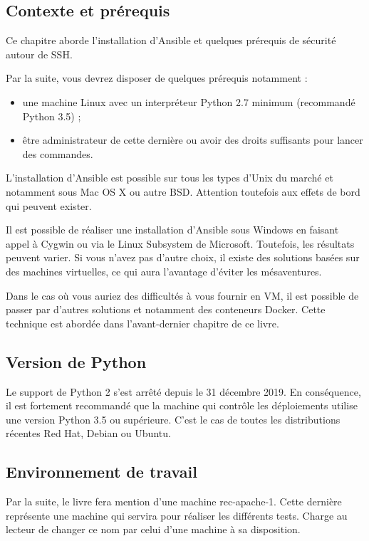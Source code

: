 \documentclass[hidelinks]{article}
\begin{document}
\subsection{Contexte et prérequis}
Ce chapitre aborde l'installation d'Ansible et quelques prérequis de sécurité autour de SSH.

Par la suite, vous devrez disposer de quelques prérequis notamment  :
\begin{itemize}
    \item une machine Linux avec un interpréteur Python 2.7 minimum (recommandé Python 3.5) ;
    \item être administrateur de cette dernière ou avoir des droits suffisants pour lancer des commandes.
\end{itemize}

L'installation d'Ansible est possible sur tous les types d'Unix du marché et notamment sous Mac OS X ou autre BSD. Attention toutefois aux effets de bord qui peuvent exister.

Il est possible de réaliser une installation d'Ansible sous Windows en faisant appel à Cygwin ou via le Linux Subsystem de Microsoft. Toutefois, les résultats peuvent varier. Si vous n'avez pas d'autre choix, il existe des solutions basées sur des machines virtuelles, ce qui aura l'avantage d'éviter les mésaventures.

Dans le cas où vous auriez des difficultés à vous fournir en VM, il est possible de passer par d'autres solutions et notamment des conteneurs Docker. Cette technique est abordée dans l'avant-dernier chapitre de ce livre.

\subsection{Version de Python}
Le support de Python 2 s'est arrêté depuis le 31 décembre 2019. En conséquence, il est fortement recommandé que la machine qui contrôle les déploiements utilise une version Python 3.5 ou supérieure. C'est le cas de toutes les distributions récentes Red Hat, Debian ou Ubuntu.

\subsection{Environnement de travail}
Par la suite, le livre fera mention d'une machine rec-apache-1. Cette dernière représente une machine qui servira pour réaliser les différents tests. Charge au lecteur de changer ce nom par celui d'une machine à sa disposition.
\end{document}
